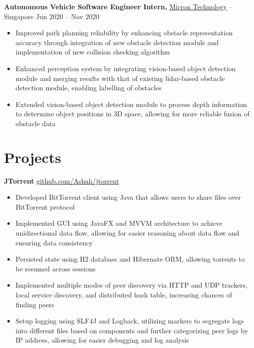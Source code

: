 \documentclass[11pt]{article}       %
\begin{document}
\textbf{Autonomous Vehicle Software Engineer Intern,} \href{https://www.micron.com/}{Micron Technology} -- Singapore \hfill Jun 2020 -- Nov 2020 \\
\vspace{-9pt}
\begin{itemize}
  \item Improved path planning reliability by enhancing obstacle representation accuracy through integration of new obstacle detection module and implementation of new collision checking algorithm
  \item Enhanced perception system by integrating vision-based object detection module and merging results with that of existing lidar-based obstacle detection module, enabling labelling of obstacles
  \item Extended vision-based object detection module to process depth information to determine object positions in 3D space, allowing for more reliable fusion of obstacle data
\end{itemize}

\vspace{-18.5pt}

\section*{Projects}
\textbf{JTorrent} \hfill \href{https://github.com/Ashuh/jtorrent}{github.com/Ashuh/jtorrent} \\
\vspace{-9pt}
\begin{itemize}
  \item Developed BitTorrent client using Java that allows users to share files over BitTorrent protocol
  \item Implemented GUI using JavaFX and MVVM architecture to achieve unidirectional data flow, allowing for easier reasoning about data flow and ensuring data consistency
  \item Persisted state using H2 database and Hibernate ORM, allowing torrents to be resumed across sessions
  \item Implemented multiple modes of peer discovery via HTTP and UDP trackers, local service discovery, and distributed hash table, increasing chances of finding peers
  \item Setup logging using SLF4J and Logback, utilizing markers to segregate logs into different files based on components and further categorizing peer logs by IP address, allowing for easier debugging and log analysis
\end{itemize}
\end{document}
